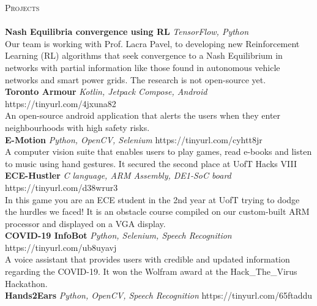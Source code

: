 \documentclass[a4paper]{article}
\newcommand{\lineunder} {
    \vspace*{-8pt} \\
    \hspace*{-18pt} \hrulefill \\
}
\newcommand{\header} [1] {
    {\hspace*{-18pt}\vspace*{6pt} \textsc{#1}}
    \vspace*{-6pt} \lineunder
}
\begin{document}
\header{Projects}
{\textbf{Nash Equilibria convergence using RL}} {\sl TensorFlow, Python} \\
Our team is working with Prof. Lacra Pavel, to developing new Reinforcement Learning (RL) algorithms that seek convergence to a Nash Equilibrium in networks
 with partial information like those found in autonomous vehicle networks and smart power grids. The research is not open-source yet.\\
\vspace*{2mm}
{\textbf{Toronto Armour}} {\sl Kotlin, Jetpack Compose, Android} \hfill https://tinyurl.com/4jxuna82\\
An open-source android application that alerts the users when they enter neighbourhoods with high safety risks.\\
\vspace*{2mm}
{\textbf{E-Motion}} {\sl Python, OpenCV, Selenium} \hfill https://tinyurl.com/cyhtt8jr\\
A computer vision suite that enables users to play games, read e-books and listen to music using hand gestures. It secured the second place at UofT Hacks VIII\\
\vspace*{2mm}
{\textbf{ECE-Hustler}} {\sl C language, ARM Assembly, DE1-SoC board} \hfill https://tinyurl.com/d38wrur3\\
In this game you are an ECE student in the 2nd year at UofT trying to dodge the hurdles we faced! It is an obstacle course compiled on our custom-built ARM processor and displayed on a VGA display.\\
\vspace*{2mm}
{\textbf{COVID-19 InfoBot}} {\sl Python, Selenium, Speech Recognition} \hfill https://tinyurl.com/ub8uyavj\\
A voice assistant that provides users with credible and updated information regarding the COVID-19. It won the Wolfram award at the Hack\_The\_Virus Hackathon.\\
\vspace*{2mm}
{\textbf{Hands2Ears}} {\sl Python, OpenCV, Speech Recognition} \hfill https://tinyurl.com/65ftaddu\\
\end{document}
